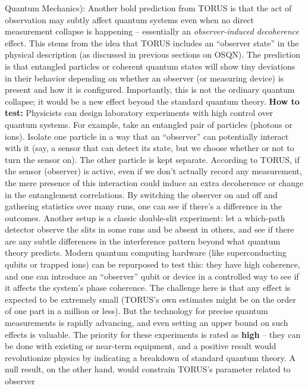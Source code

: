 \documentclass[]{article}
\begin{document}
\begin{itemize}
{  Quantum Mechanics):} Another bold prediction from TORUS is that the
  act of observation may subtly affect quantum systems even when no
  direct measurement collapse is happening -- essentially an
  \emph{observer-induced decoherence} effect. This stems from the idea
  that TORUS includes an ``observer state'' in the physical description
  (as discussed in previous sections on OSQN). The prediction is that
  entangled particles or coherent quantum states will show tiny
  deviations in their behavior depending on whether an observer (or
  measuring device) is present and how it is configured​. Importantly,
  this is not the ordinary quantum collapse; it would be a new effect
  beyond the standard quantum theory. \textbf{How to test:} Physicists
  can design laboratory experiments with high control over quantum
  systems. For example, take an entangled pair of particles (photons or
  ions). Isolate one particle in a way that an ``observer'' can
  potentially interact with it (say, a sensor that can detect its state,
  but we choose whether or not to turn the sensor on). The other
  particle is kept separate. According to TORUS, if the sensor
  (observer) is active, even if we don't actually record any
  measurement, the mere presence of this interaction could induce an
  extra decoherence or change in the entanglement correlations. By
  switching the observer on and off and gathering statistics over many
  runs, one can see if there's a difference in the outcomes​. Another
  setup is a classic double-slit experiment: let a which-path detector
  observe the slits in some runs and be absent in others, and see if
  there are any subtle differences in the interference pattern beyond
  what quantum theory predicts. Modern quantum computing hardware (like
  superconducting qubits or trapped ions) can be repurposed to test
  this: they have high coherence, and one can introduce an ``observer''
  qubit or device in a controlled way to see if it affects the system's
  phase coherence​. The challenge here is that any effect is expected to
  be extremely small (TORUS's own estimates might be on the order of one
  part in a million or less​). But the technology for precise quantum
  measurements is rapidly advancing, and even setting an upper bound on
  such effects is valuable. The priority for these experiments is rated
  as \textbf{high} -- they can be done with existing or near-term
  equipment, and a positive result would revolutionize physics by
  indicating a breakdown of standard quantum theory. A null result, on
  the other hand, would constrain TORUS's parameter related to observer

\end{itemize}
\end{document}
